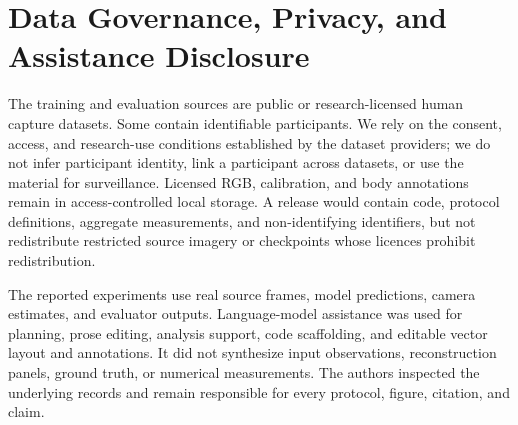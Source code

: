 \section{Data Governance, Privacy, and Assistance Disclosure}

The training and evaluation sources are public or research-licensed human
capture datasets. Some contain identifiable participants. We rely on the
consent, access, and research-use conditions established by the dataset
providers; we do not infer participant identity, link a participant across
datasets, or use the material for surveillance. Licensed RGB, calibration,
and body annotations remain in access-controlled local storage. A release
would contain code, protocol definitions, aggregate measurements, and
non-identifying identifiers, but not redistribute restricted source imagery or
checkpoints whose licences prohibit redistribution.

The reported experiments use real source frames, model predictions, camera
estimates, and evaluator outputs. Language-model assistance was used for
planning, prose editing, analysis support, code scaffolding, and editable
vector layout and annotations. It did not synthesize input observations,
reconstruction panels, ground truth, or numerical measurements. The authors
inspected the underlying records and remain responsible for every protocol,
figure, citation, and claim.
